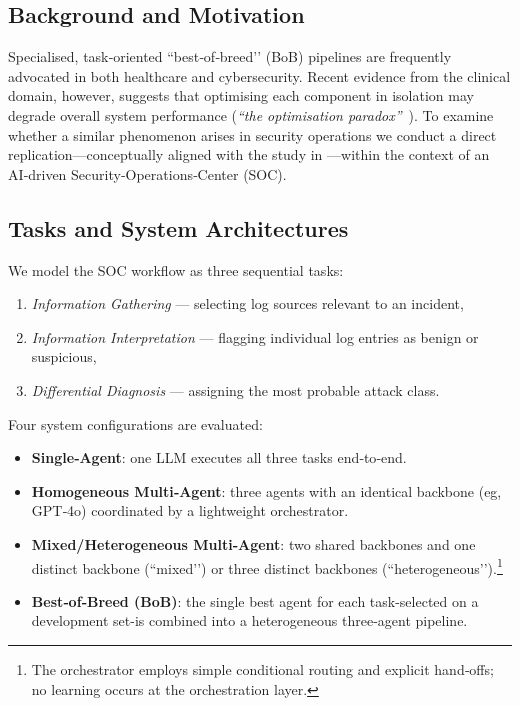 \documentclass[10pt,conference]{IEEEtran}
\begin{document}
\subsection{Background and Motivation}
Specialised, task‑oriented ``best‑of‑breed’’ (BoB) pipelines are frequently
advocated in both healthcare and cybersecurity.
Recent evidence from the clinical domain, however, suggests that optimising
each component in isolation may degrade overall system performance
(\textit{``the optimisation paradox''}~\cite{clinical_paradox_2025}).  
To examine whether a similar phenomenon arises in security operations we
conduct a direct replication—conceptually aligned with the study in
\cite{clinical_paradox_2025}—within the context of an
AI‑driven Security‑Operations‑Center (SOC).

\subsection{Tasks and System Architectures}
We model the SOC workflow as three sequential tasks:
\begin{enumerate}[label=\textbf{T\arabic*}]
  \item \emph{Information Gathering} — selecting log sources relevant to an
        incident,
  \item \emph{Information Interpretation} — flagging individual log entries as
        benign or suspicious,
  \item \emph{Differential Diagnosis} — assigning the most probable attack
        class.
\end{enumerate}

Four system configurations are evaluated:
\begin{itemize}
  \item \textbf{Single‑Agent}: one LLM executes all three tasks end‑to‑end.
  \item \textbf{Homogeneous Multi‑Agent}: three agents with an identical
        backbone (eg, GPT‑4o) coordinated by a lightweight
        orchestrator.
  \item \textbf{Mixed/Heterogeneous Multi‑Agent}: two shared backbones and one
        distinct backbone (``mixed’’) or three distinct backbones
        (``heterogeneous’’).\footnote{The orchestrator employs simple
        conditional routing and explicit hand‑offs; no learning occurs at the
        orchestration layer.}
  \item \textbf{Best‑of‑Breed (BoB)}: the single best agent for each task-selected on a development set-is
        combined into a heterogeneous three‑agent pipeline.
\end{itemize}
\end{document}
